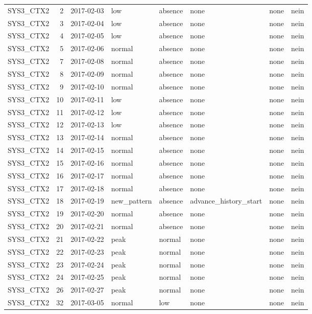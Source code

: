 \begin{tabular}{lrllllll}
SYS3\_CTX2 & 2 & 2017-02-03 & low & absence & none & none & nein \\
SYS3\_CTX2 & 3 & 2017-02-04 & low & absence & none & none & nein \\
SYS3\_CTX2 & 4 & 2017-02-05 & low & absence & none & none & nein \\
SYS3\_CTX2 & 5 & 2017-02-06 & normal & absence & none & none & nein \\
SYS3\_CTX2 & 7 & 2017-02-08 & normal & absence & none & none & nein \\
SYS3\_CTX2 & 8 & 2017-02-09 & normal & absence & none & none & nein \\
SYS3\_CTX2 & 9 & 2017-02-10 & normal & absence & none & none & nein \\
SYS3\_CTX2 & 10 & 2017-02-11 & low & absence & none & none & nein \\
SYS3\_CTX2 & 11 & 2017-02-12 & low & absence & none & none & nein \\
SYS3\_CTX2 & 12 & 2017-02-13 & low & absence & none & none & nein \\
SYS3\_CTX2 & 13 & 2017-02-14 & normal & absence & none & none & nein \\
SYS3\_CTX2 & 14 & 2017-02-15 & normal & absence & none & none & nein \\
SYS3\_CTX2 & 15 & 2017-02-16 & normal & absence & none & none & nein \\
SYS3\_CTX2 & 16 & 2017-02-17 & normal & absence & none & none & nein \\
SYS3\_CTX2 & 17 & 2017-02-18 & normal & absence & none & none & nein \\
SYS3\_CTX2 & 18 & 2017-02-19 & new\_pattern & absence & advance\_history\_start & none & nein \\
SYS3\_CTX2 & 19 & 2017-02-20 & normal & absence & none & none & nein \\
SYS3\_CTX2 & 20 & 2017-02-21 & normal & absence & none & none & nein \\
SYS3\_CTX2 & 21 & 2017-02-22 & peak & normal & none & none & nein \\
SYS3\_CTX2 & 22 & 2017-02-23 & peak & normal & none & none & nein \\
SYS3\_CTX2 & 23 & 2017-02-24 & peak & normal & none & none & nein \\
SYS3\_CTX2 & 24 & 2017-02-25 & peak & normal & none & none & nein \\
SYS3\_CTX2 & 26 & 2017-02-27 & peak & normal & none & none & nein \\
SYS3\_CTX2 & 32 & 2017-03-05 & normal & low & none & none & nein \\

\end{tabular}
